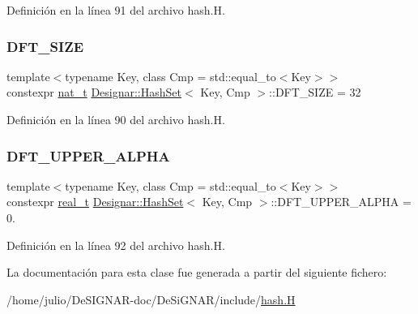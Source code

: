 Definición en la línea 91 del archivo hash.\+H.

\mbox{\label{class_designar_1_1_hash_set_a23c3da93ad9449838ab2c78526cd9dbd}} 
\subsubsection{\texorpdfstring{D\+F\+T\+\_\+\+S\+I\+ZE}{DFT\_SIZE}}
{\footnotesize\ttfamily template$<$typename Key, class Cmp = std\+::equal\+\_\+to$<$\+Key$>$$>$ \\
constexpr \hyperlink{namespace_designar_aa72662848b9f4815e7bf31a7cf3e33d1}{nat\+\_\+t} \hyperlink{class_designar_1_1_hash_set}{Designar\+::\+Hash\+Set}$<$ Key, Cmp $>$\+::D\+F\+T\+\_\+\+S\+I\+ZE = 32\hspace{0.3cm}{\ttfamily [static]}}



Definición en la línea 90 del archivo hash.\+H.

\mbox{\label{class_designar_1_1_hash_set_ab7e07181f29465aa1457e6abb9397be1}} 
\subsubsection{\texorpdfstring{D\+F\+T\+\_\+\+U\+P\+P\+E\+R\+\_\+\+A\+L\+P\+HA}{DFT\_UPPER\_ALPHA}}
{\footnotesize\ttfamily template$<$typename Key, class Cmp = std\+::equal\+\_\+to$<$\+Key$>$$>$ \\
constexpr \hyperlink{namespace_designar_aca2c32af26808dbec1f3a3071fad25ce}{real\+\_\+t} \hyperlink{class_designar_1_1_hash_set}{Designar\+::\+Hash\+Set}$<$ Key, Cmp $>$\+::D\+F\+T\+\_\+\+U\+P\+P\+E\+R\+\_\+\+A\+L\+P\+HA = 0.\hspace{0.3cm}{\ttfamily [static]}}



Definición en la línea 92 del archivo hash.\+H.



La documentación para esta clase fue generada a partir del siguiente fichero\+:\begin{DoxyCompactItemize}
\item 
/home/julio/\+De\+S\+I\+G\+N\+A\+R-\/doc/\+De\+Si\+G\+N\+A\+R/include/\hyperlink{hash_8_h}{hash.\+H}\end{DoxyCompactItemize}
